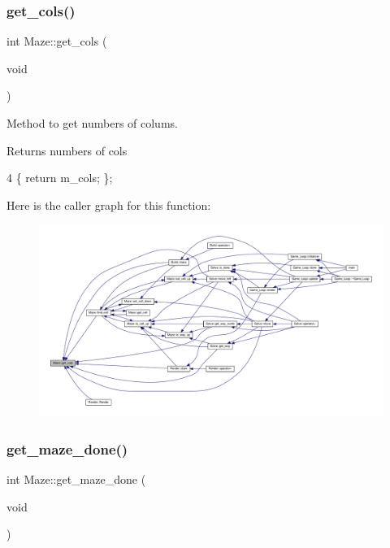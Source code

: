 \subsubsection{\texorpdfstring{get\+\_\+cols()}{get\_cols()}}
{\footnotesize\ttfamily int Maze\+::get\+\_\+cols (\begin{DoxyParamCaption}\item[{void}]{ }\end{DoxyParamCaption})}



Method to get numbers of colums. 

\begin{DoxyReturn}{Returns}
numbers of cols 
\end{DoxyReturn}

\begin{DoxyCode}
4 \{ \textcolor{keywordflow}{return} m\_cols; \};
\end{DoxyCode}
Here is the caller graph for this function\+:\nopagebreak
\begin{figure}[H]
\begin{center}
\leavevmode
\includegraphics[width=350pt]{classMaze_a8a04cd1335e96a80358181afa164d4c9_icgraph}
\end{center}
\end{figure}
\mbox{\label{classMaze_a152979999dd4c75014d65bf6deb5a00c}} 
\subsubsection{\texorpdfstring{get\+\_\+maze\+\_\+done()}{get\_maze\_done()}}
{\footnotesize\ttfamily int Maze\+::get\+\_\+maze\+\_\+done (\begin{DoxyParamCaption}\item[{void}]{ }\end{DoxyParamCaption})}



